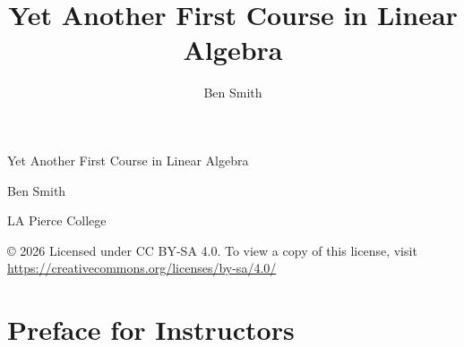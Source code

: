 \documentclass[11pt, letterpaper]{report}
\title{Yet Another First Course in Linear Algebra}
\author{Ben Smith}
\date{}
\begin{document}
\raggedcolumns


\hspace{1pt}

\vspace{2in}

\begin{center}
\begin{Large}
Yet Another First Course in Linear Algebra
\end{Large}

\vspace{2em}
\begin{large}
Ben Smith

LA Pierce College
\end{large}

© 2026 Licensed under CC BY-SA 4.0. To view a copy of this license, visit \href{https://creativecommons.org/licenses/by-sa/4.0/}{https://creativecommons.org/licenses/by-sa/4.0/}
\end{center}

\newpage
\tableofcontents

\section{Preface for Instructors}
\end{document}
